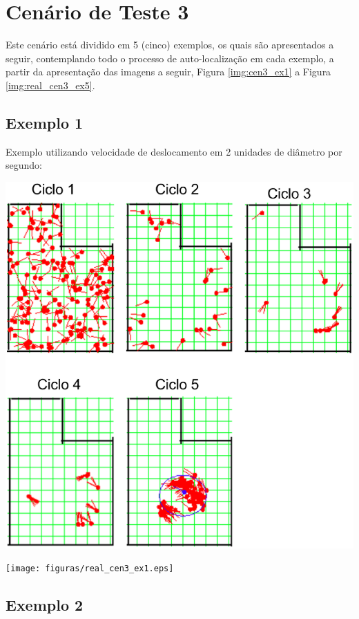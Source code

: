 \section{Cenário de Teste 3}

Este cenário está dividido em 5 (cinco) exemplos, os quais são apresentados a seguir, contemplando todo o processo de auto-localização
em cada exemplo, a partir da apresentação das imagens a seguir, Figura \ref{img:cen3_ex1} a Figura \ref{img:real_cen3_ex5}.

\subsection{Exemplo 1}

Exemplo utilizando velocidade de deslocamento em 2 unidades de diâmetro por segundo:

{\centering
\includegraphics[scale=0.4]{figuras/cen3_ex1.eps}
\label{img:cen3_ex1}
\par}

{\centering
\texttt{[image: figuras/real\_cen3\_ex1.eps]}
\label{img:real_cen3_ex1}
\par}


\subsection{Exemplo 2}

